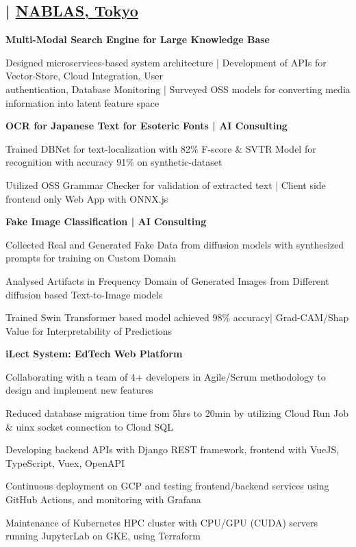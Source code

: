 \documentclass[a4paper,10pt]{article}
\newcommand{\SubItem}[1]{
    {\setlength\itemindent{13pt} \item[\raisebox{.25\height}{\tiny\square}] #1}
}
\newlength{\itemgap}
\newlength{\itembefore}
\newcommand\scl{1.05}
\begin{document}
\subsection{{\textbf{\scalebox{\scl}{\textbf{AI \& Software Engineer}}} | \href{https://www.nablas.com/}{NABLAS, Tokyo} }  \hfill\scalebox{0.9}{[Aug'22-Present]}}
\begin{itemize}[topsep=\itembefore,itemsep=\itemgap,partopsep=0pt, parsep=0pt]
  
  
  \item \textbf {Multi-Modal Search Engine for Large Knowledge Base}
  \SubItem{Designed microservices-based system architecture | Development of APIs for Vector-Store, Cloud Integration, User \\ authentication, Database Monitoring | Surveyed OSS models for converting media information into latent feature space}
    
  \item \textbf {OCR for Japanese Text for Esoteric Fonts | AI Consulting}
  \SubItem{Trained DBNet for text-localization with 82\% F-score \& SVTR Model for recognition with accuracy 91\% on synthetic-dataset}
  \SubItem{Utilized OSS Grammar Checker for validation of extracted text | Client side frontend only Web App with ONNX.js}
  
  \item \textbf {Fake Image Classification | AI Consulting}
  \SubItem{Collected Real and Generated Fake Data from diffusion models with synthesized prompts for training on Custom Domain}
  \SubItem{Analysed Artifacts in Frequency Domain of Generated Images from Different diffusion based Text-to-Image models }
  \SubItem{Trained Swin Transformer based model achieved 98\% accuracy| Grad-CAM/Shap Value for Interpretability of Predictions}

  \item \textbf {iLect System: EdTech Web Platform}
  \SubItem{Collaborating with a team of 4+ developers in Agile/Scrum methodology to design and implement new features}
  \SubItem{Reduced database migration time from 5hrs to 20min by utilizing Cloud Run Job \& uinx socket connection to Cloud SQL}
  \SubItem{Developing backend APIs with Django REST framework, frontend with VueJS, TypeScript, Vuex, OpenAPI}
  \SubItem{Continuous deployment on GCP and testing frontend/backend services using GitHub Actions, and monitoring with Grafana}
  \SubItem{Maintenance of Kubernetes HPC cluster with CPU/GPU (CUDA) servers running JupyterLab on GKE, using Terraform}


\end{itemize}
\end{document}
